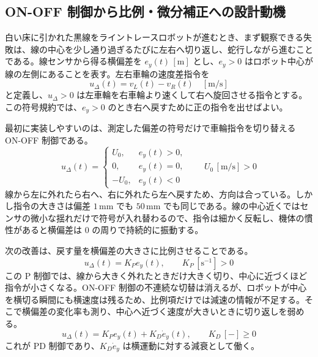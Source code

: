 \subsection{ON-OFF 制御から比例・微分補正への設計動機}

白い床に引かれた黒線をライントレースロボットが進むとき、まず観察できる失敗は、線の中心を少し通り過ぎるたびに左右へ切り返し、蛇行しながら進むことである。線センサから得る横偏差を $e_y(t)\,[\mathrm{m}]$ とし、$e_y>0$ はロボット中心が線の左側にあることを表す。左右車輪の速度差指令を
\begin{equation}
  u_\Delta(t)=v_L(t)-v_R(t)\quad [\mathrm{m/s}]
\end{equation}
と定義し、$u_\Delta>0$ は左車輪を右車輪より速くして右へ旋回させる指令とする。この符号規約では、$e_y>0$ のとき右へ戻すために正の指令を出せばよい。

最初に実装しやすいのは、測定した偏差の符号だけで車輪指令を切り替える ON-OFF 制御である。
\begin{equation}
  u_\Delta(t)=
  \begin{cases}
    U_0, & e_y(t)>0,\\
    0, & e_y(t)=0,\\
    -U_0, & e_y(t)<0
  \end{cases}
  \qquad U_0\,[\mathrm{m/s}]>0
\end{equation}
線から左に外れたら右へ、右に外れたら左へ戻すため、方向は合っている。しかし指令の大きさは偏差 $1\,\mathrm{mm}$ でも $50\,\mathrm{mm}$ でも同じである。線の中心近くではセンサの微小な揺れだけで符号が入れ替わるので、指令は細かく反転し、機体の慣性があると横偏差は 0 の周りで持続的に振動する。

次の改善は、戻す量を横偏差の大きさに比例させることである。
\begin{equation}
  u_\Delta(t)=K_Pe_y(t),\qquad K_P\,[\mathrm{s}^{-1}]>0
\end{equation}
この P 制御では、線から大きく外れたときだけ大きく切り、中心に近づくほど指令が小さくなる。ON-OFF 制御の不連続な切替は消えるが、ロボットが中心を横切る瞬間にも横速度は残るため、比例項だけでは減速の情報が不足する。そこで横偏差の変化率も測り、中心へ近づく速度が大きいときに切り返しを弱める。
\begin{equation}
  u_\Delta(t)=K_Pe_y(t)+K_D\dot{e}_y(t),
  \qquad K_D\,[-]\geq0
\end{equation}
これが PD 制御であり、$K_D\dot{e}_y$ は横運動に対する減衰として働く。

